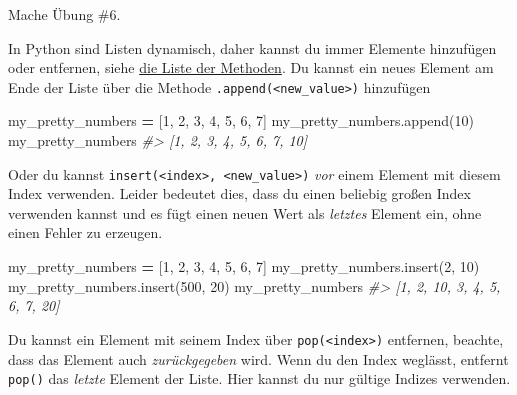 \documentclass[
]{book}
\newenvironment{Shaded}{\begin{snugshade}}{\end{snugshade}}
\newcommand{\CommentTok}[1]{\textcolor[rgb]{0.56,0.35,0.01}{\textit{#1}}}
\newcommand{\DecValTok}[1]{\textcolor[rgb]{0.00,0.00,0.81}{#1}}
\newcommand{\NormalTok}[1]{#1}
\newcommand{\OperatorTok}[1]{\textcolor[rgb]{0.81,0.36,0.00}{\textbf{#1}}}
\begin{document}
Mache Übung \#6.

In Python sind Listen dynamisch, daher kannst du immer Elemente hinzufügen oder entfernen, siehe \href{https://docs.python.org/3/tutorial/datastructures.html\#more-on-lists}{die Liste der Methoden}. Du kannst ein neues Element am Ende der Liste über die Methode \texttt{.append(\textless{}new\_value\textgreater{})} hinzufügen

\begin{Shaded}
\begin{Highlighting}[]
\NormalTok{my\_pretty\_numbers }\OperatorTok{=}\NormalTok{ [}\DecValTok{1}\NormalTok{, }\DecValTok{2}\NormalTok{, }\DecValTok{3}\NormalTok{, }\DecValTok{4}\NormalTok{, }\DecValTok{5}\NormalTok{, }\DecValTok{6}\NormalTok{, }\DecValTok{7}\NormalTok{]}
\NormalTok{my\_pretty\_numbers.append(}\DecValTok{10}\NormalTok{)}
\NormalTok{my\_pretty\_numbers}
\CommentTok{\#\textgreater{} [1, 2, 3, 4, 5, 6, 7, 10]}
\end{Highlighting}
\end{Shaded}

Oder du kannst \texttt{insert(\textless{}index\textgreater{},\ \textless{}new\_value\textgreater{})} \emph{vor} einem Element mit diesem Index verwenden. Leider bedeutet dies, dass du einen beliebig großen Index verwenden kannst und es fügt einen neuen Wert als \emph{letztes} Element ein, ohne einen Fehler zu erzeugen.

\begin{Shaded}
\begin{Highlighting}[]
\NormalTok{my\_pretty\_numbers }\OperatorTok{=}\NormalTok{ [}\DecValTok{1}\NormalTok{, }\DecValTok{2}\NormalTok{, }\DecValTok{3}\NormalTok{, }\DecValTok{4}\NormalTok{, }\DecValTok{5}\NormalTok{, }\DecValTok{6}\NormalTok{, }\DecValTok{7}\NormalTok{]}
\NormalTok{my\_pretty\_numbers.insert(}\DecValTok{2}\NormalTok{, }\DecValTok{10}\NormalTok{)}
\NormalTok{my\_pretty\_numbers.insert(}\DecValTok{500}\NormalTok{, }\DecValTok{20}\NormalTok{)}
\NormalTok{my\_pretty\_numbers}
\CommentTok{\#\textgreater{} [1, 2, 10, 3, 4, 5, 6, 7, 20]}
\end{Highlighting}
\end{Shaded}

Du kannst ein Element mit seinem Index über \texttt{pop(\textless{}index\textgreater{})} entfernen, beachte, dass das Element auch \emph{zurückgegeben} wird. Wenn du den Index weglässt, entfernt \texttt{pop()} das \emph{letzte} Element der Liste. Hier kannst du nur gültige Indizes verwenden.
\end{document}
